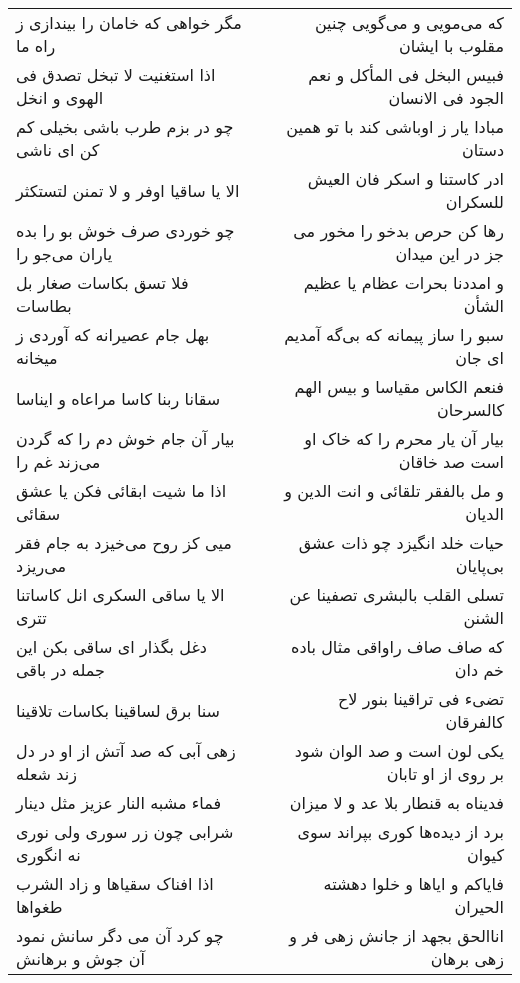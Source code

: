 \begin{center}
\begin{longtable}{l p{0.5cm} r}
مگر خواهی که خامان را بیندازی ز راه ما
&&
که می‌مویی و می‌گویی چنین مقلوب با ایشان
\\
اذا استغنیت لا تبخل تصدق فی الهوی و انخل
&&
فبیس البخل فی المأکل و نعم الجود فی الانسان
\\
چو در بزم طرب باشی بخیلی کم کن ای ناشی
&&
مبادا یار ز اوباشی کند با تو همین دستان
\\
الا یا ساقیا اوفر و لا تمنن لتستکثر
&&
ادر کاستنا و اسکر فان العیش للسکران
\\
چو خوردی صرف خوش بو را بده یاران می‌جو را
&&
رها کن حرص بدخو را مخور می جز در این میدان
\\
فلا تسق بکاسات صغار بل بطاسات
&&
و امددنا بحرات عظام یا عظیم الشأن
\\
بهل جام عصیرانه که آوردی ز میخانه
&&
سبو را ساز پیمانه که بی‌گه آمدیم ای جان
\\
سقانا ربنا کاسا مراعاه و ایناسا
&&
فنعم الکاس مقیاسا و بیس الهم کالسرحان
\\
بیار آن جام خوش دم را که گردن می‌زند غم را
&&
بیار آن یار محرم را که خاک او است صد خاقان
\\
اذا ما شیت ابقائی فکن یا عشق سقائی
&&
و مل بالفقر تلقائی و انت الدین و الدیان
\\
میی کز روح می‌خیزد به جام فقر می‌ریزد
&&
حیات خلد انگیزد چو ذات عشق بی‌پایان
\\
الا یا ساقی السکری انل کاساتنا تتری
&&
تسلی القلب بالبشری تصفینا عن الشنن
\\
دغل بگذار ای ساقی بکن این جمله در باقی
&&
که صاف صاف راواقی مثال باده خم دان
\\
سنا برق لساقینا بکاسات تلاقینا
&&
تضیء فی تراقینا بنور لاح کالفرقان
\\
زهی آبی که صد آتش از او در دل زند شعله
&&
یکی لون است و صد الوان شود بر روی از او تابان
\\
فماء مشبه النار عزیز مثل دینار
&&
فدیناه به قنطار بلا عد و لا میزان
\\
شرابی چون زر سوری ولی نوری نه انگوری
&&
برد از دیده‌ها کوری بپراند سوی کیوان
\\
اذا افناک سقیاها و زاد الشرب طغواها
&&
فایاکم و ایاها و خلوا دهشته الحیران
\\
چو کرد آن می دگر سانش نمود آن جوش و برهانش
&&
اناالحق بجهد از جانش زهی فر و زهی برهان
\\
\end{longtable}
\end{center}
